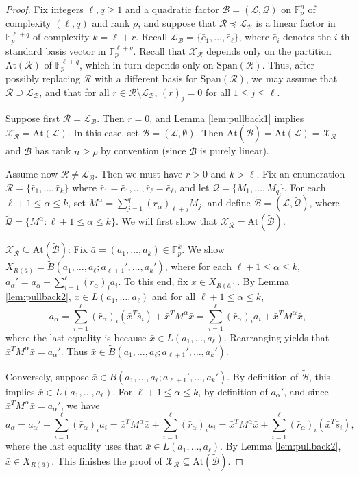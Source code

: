 \documentclass[12pt,oneside,british,a4wide]{amsart}
\numberwithin{equation}{section}
\theoremstyle{definition}
\def\F{\mathbb{F}}
\newcommand{\abar}{\bar{a}}
\newcommand{\ebar}{\bar{e}}
\newcommand{\rbar}{\bar{r}}
\newcommand{\sbar}{\bar{s}}
\newcommand{\xbar}{\bar{x}}
\newcommand{\calL}{\mathcal{L}}
\newcommand{\calB}{\mathcal{B}}
\newcommand{\calQ}{\mathcal{Q}}
\newcommand{\calR}{\mathcal{R}}
\newcommand{\calX}{\mathcal{X}}
\newcommand{\Span}{{\mathrm{Span}}}
\newcommand{\At}{{\mathrm{At}}}
\begin{document}
\begin{proof}
Fix integers $\ell,q\geq 1$ and a quadratic factor $\calB=(\calL,\calQ)$ on $\F_p^n$ of complexity $(\ell,q)$ and rank $\rho$, and suppose that $\calR\preceq\calL_{\calB}$ is a linear factor in $\F_p^{\ell+q}$ of complexity $k=\ell+r$.  Recall $\calL_{\calB}=\{\ebar_1,\ldots, \ebar_{\ell}\}$, where $\ebar_i$ denotes the $i$-th standard basis vector in $\F_p^{\ell+q}$.  Recall that $\calX_{\calR}$ depends only on the partition $\At(\calR)$ of $\F_p^{\ell+q}$, which in turn depends only on $\Span(\calR)$. Thus, after possibly replacing $\calR$ with a different basis for $\Span(\calR)$, we may assume  that $\calR\supseteq \calL_{\calB}$, and that for all $\rbar\in \calR\setminus \calL_{\calB}$, $(\rbar)_j=0$ for all $1\leq j\leq \ell$. 

Suppose first $\calR=\calL_{\calB}$. Then $r=0$, and Lemma \ref{lem:pullback1} implies $\calX_{\calR}=\At(\calL)$.  In this case, set $\tilde{\calB}=(\calL,\emptyset)$. Then $\At(\tilde{\calB})=\At(\calL)=\calX_{\calR}$ and $\tilde{\calB}$ has  rank $n\geq \rho$ by convention (since $\tilde{\calB}$ is purely linear).   

 Assume now $\calR\neq \calL_{\calB}$. Then we must have $r>0$ and $k>\ell$.  Fix an enumeration  $\calR=\{\rbar_1,\ldots, \rbar_k\}$ where $\rbar_1=\ebar_1,\ldots, \rbar_{\ell}=\ebar_{\ell}$, and let  $\calQ=\{M_1,\ldots, M_q\}$.  For each $\ell+1\leq \alpha\leq k$, set $M^\alpha=\sum_{j=1}^q (\rbar_\alpha)_{\ell+j}M_j$, and define $\tilde{\calB}=(\calL,\tilde{\calQ})$, where $\tilde{\calQ}=\{M^{\alpha}: \ell+1\leq \alpha \leq k\}$.   We will first show  that $\calX_{\calR}=\At(\tilde{\calB})$.
 
 \underline{$\calX_{\calR}\subseteq \At(\tilde{\calB})$:} Fix  $\abar=(a_1,\ldots, a_k)\in \F_p^k$. We show $X_{R(\abar)}=\tilde{B}(a_1,\ldots, a_{\ell}; a_{\ell+1}',\ldots, a_k')$, where for each $\ell+1\leq \alpha\leq k$, $a_{\alpha}'=a_{\alpha}-\sum_{i=1}^{\ell}(\rbar_{\alpha})_ia_i$.  To this end, fix $\xbar\in X_{R(\abar)}$.   By Lemma \ref{lem:pullback2},  $\xbar\in L(a_1,\ldots, a_{\ell})$ and for all $\ell+1\leq \alpha\leq k$,  
$$
a_{\alpha}=\sum_{i=1}^{\ell} (\rbar_\alpha)_i (\xbar^T \sbar_i) +\xbar^TM^\alpha \xbar=\sum_{i=1}^{\ell}(\rbar_{\alpha})_ia_i+\xbar^TM^\alpha \xbar,
$$
where the last equality is because $\xbar\in L(a_1,\ldots,a_{\ell})$.  Rearranging yields that $\xbar^TM^{\alpha}\xbar=a_{\alpha}'$.  Thus $\xbar\in \tilde{B}(a_1,\ldots, a_{\ell}; a_{\ell+1}',\ldots, a_k')$.

Conversely, suppose $\xbar\in \tilde{B}(a_1,\ldots, a_{\ell}; a_{\ell+1}',\ldots, a_k')$.    By definition of $\tilde{\calB}$, this implies  $\xbar\in L(a_1,\ldots, a_{\ell})$.   For $\ell+1\leq \alpha\leq k$, by definition of $a_{\alpha}'$, and since $\xbar^TM^{\alpha}\xbar=a_{\alpha}'$,  we have
$$
a_{\alpha}=a_{\alpha}'+\sum_{i=1}^{\ell}(\rbar_{\alpha})_ia_i=\xbar^TM^\alpha \xbar+\sum_{i=1}^{\ell}(\rbar_{\alpha})_ia_i=\xbar^TM^\alpha \xbar+\sum_{i=1}^{\ell} (\rbar_\alpha)_i (\xbar^T \sbar_i),
$$
where the last equality uses that $\xbar\in L(a_1,\ldots, a_{\ell})$.  By Lemma \ref{lem:pullback2}, $\xbar\in X_{R(\abar)}$. This finishes the proof of $\calX_{\calR}\subseteq \At(\tilde{\calB})$.
 

\end{proof}
\end{document}
